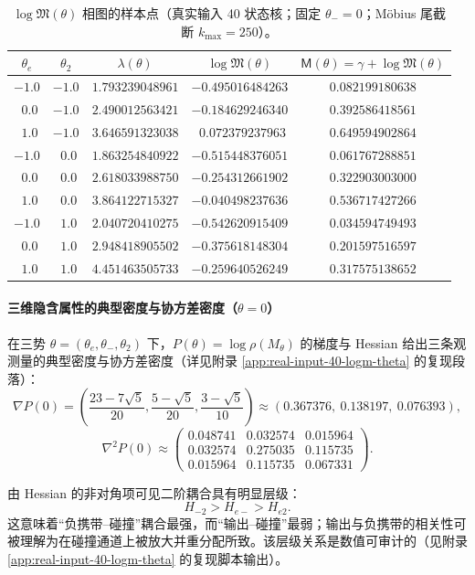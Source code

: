 \begin{table}[H]
\centering
\scriptsize
\setlength{\tabcolsep}{8pt}
\renewcommand{\arraystretch}{1.15}
\caption{$\log\mathfrak{M}(\theta)$ 相图的样本点（真实输入 40 状态核；固定 $\theta_-=0$；Möbius 尾截断 $k_{\max}=250$）。}
\label{tab:real-input-40-logM-theta-sample}
\begin{tabular}{@{}ccccc@{}}
\toprule
$\theta_e$ & $\theta_2$ & $\lambda(\theta)$ & $\log\mathfrak{M}(\theta)$ & $\mathsf{M}(\theta)=\gamma+\log\mathfrak{M}(\theta)$ \\
\midrule
$-1.0$ & $-1.0$ & $1.793239048961$ & $-0.495016484263$ & $0.082199180638$ \\
$\ \ 0.0$ & $-1.0$ & $2.490012563421$ & $-0.184629246340$ & $0.392586418561$ \\
$\ \ 1.0$ & $-1.0$ & $3.646591323038$ & $\ \ 0.072379237963$ & $0.649594902864$ \\
$-1.0$ & $\ \ 0.0$ & $1.863254840922$ & $-0.515448376051$ & $0.061767288851$ \\
$\ \ 0.0$ & $\ \ 0.0$ & $2.618033988750$ & $-0.254312661902$ & $0.322903003000$ \\
$\ \ 1.0$ & $\ \ 0.0$ & $3.864122715327$ & $-0.040498237636$ & $0.536717427266$ \\
$-1.0$ & $\ \ 1.0$ & $2.040720410275$ & $-0.542620915409$ & $0.034594749493$ \\
$\ \ 0.0$ & $\ \ 1.0$ & $2.948418905502$ & $-0.375618148304$ & $0.201597516597$ \\
$\ \ 1.0$ & $\ \ 1.0$ & $4.451463505733$ & $-0.259640526249$ & $0.317575138652$ \\
\bottomrule
\end{tabular}
\end{table}

\paragraph{三维隐含属性的典型密度与协方差密度（\texorpdfstring{$\theta=0$}{theta=0}）}
在三势 $\theta=(\theta_e,\theta_-,\theta_2)$ 下，$P(\theta)=\log\rho(M_\theta)$ 的梯度与 Hessian 给出三条观测量的典型密度与协方差密度（详见附录 \ref{app:real-input-40-logm-theta} 的复现段落）：
\[
\nabla P(0)=\left(\frac{23-7\sqrt5}{20},\frac{5-\sqrt5}{20},\frac{3-\sqrt5}{10}\right)\approx(0.367376,\ 0.138197,\ 0.076393),
\]
\[
\nabla^2P(0)\approx
\begin{pmatrix}
0.048741 & 0.032574 & 0.015964\\
0.032574 & 0.275035 & 0.115735\\
0.015964 & 0.115735 & 0.067331
\end{pmatrix}.
\]
\begin{remark}
由 Hessian 的非对角项可见二阶耦合具有明显层级：
\[
H_{-2}>H_{e-}>H_{e2}.
\]
这意味着“负携带--碰撞”耦合最强，而“输出--碰撞”最弱；输出与负携带的相关性可被理解为在碰撞通道上被放大并重分配所致。该层级关系是数值可审计的（见附录 \ref{app:real-input-40-logm-theta} 的复现脚本输出）。
\end{remark}

